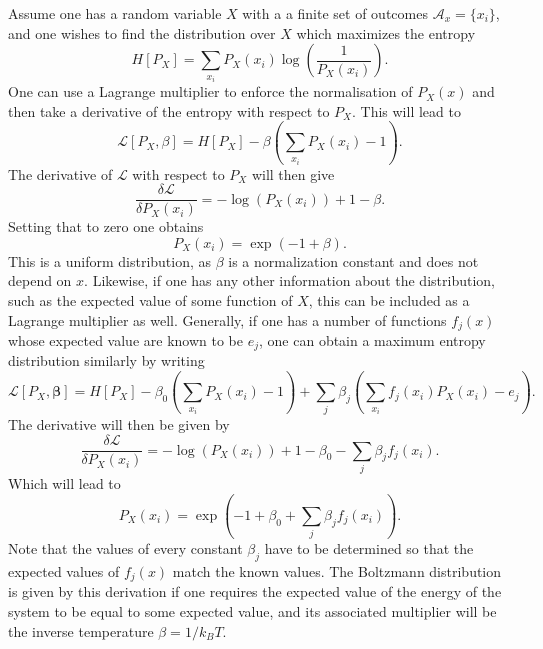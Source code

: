 Assume one has a random variable $X$ with a a finite set of outcomes $\mathcal{A}_x = \{x_i\}$, and one wishes to find the distribution over $X$ which maximizes the entropy 
\[
H[P_X] = \sum_{x_i} P_X(x_i) \log \left(\frac{1}{P_X(x_i)}\right).
\]
One can use a Lagrange multiplier to enforce the normalisation of $P_X(x)$ and then take a derivative of the entropy with respect to $P_X$. This will lead to
\[
\mathcal{L}[P_X,\beta] = H[P_X] - \beta \left(\sum_{x_i} P_X(x_i) -1\right).
\]
The derivative of $\mathcal{L}$ with respect to $P_X$ will then give
\[
\frac{\delta \mathcal{L}}{\delta P_X(x_i)} = -\log(P_X(x_i)) + 1 - \beta.
\]
Setting that to zero one obtains
\[
P_X(x_i) = \exp\left(-1+\beta \right).
\]
This is a uniform distribution, as $\beta$ is a normalization constant and does not depend on $x$. Likewise, if one has any other information about the distribution, such as the expected value of some function of $X$, this can be included as a Lagrange multiplier as well. Generally, if one has a number of functions $f_j(x)$ whose expected value are known to be $e_j$, one can obtain a maximum entropy distribution similarly by writing
\[
\mathcal{L}[P_X,\boldsymbol{\beta}] = H[P_X] - \beta_0 \left(\sum_{x_i} P_X(x_i) -1\right) +  \sum_j \beta_j \left(\sum_{x_i} f_j(x_i) P_X(x_i) -e_j\right).
\]
The derivative will then be given by
\[
\frac{\delta \mathcal{L}}{\delta P_X(x_i)} = -\log(P_X(x_i)) + 1 - \beta_0 - \sum_j \beta_j f_j(x_i).
\]
Which will lead to
\[
P_X(x_i) = \exp\left(-1+\beta_0+\sum_j \beta_j f_j(x_i)\right).
\]
Note that the values of every constant $\beta_j$ have to be determined so that the expected values of $f_j(x)$ match the known values. The Boltzmann distribution is given by this derivation if one requires the expected value of the energy of the system to be equal to some expected value, and its associated multiplier will be the inverse temperature $\beta = 1/k_B T$.
